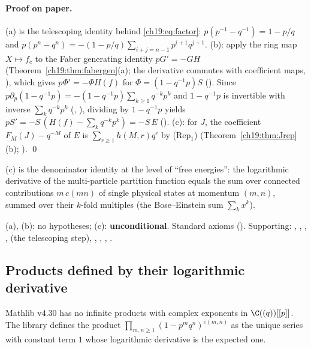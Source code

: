 \paragraph{Proof on paper.}  (a) is the telescoping identity behind \eqref{ch19:eq:factor}:
$p(p^{-1}-q^{-1})=1-p/q$ and $p(p^n-q^n)=-(1-p/q)\sum_{i+j=n-1}p^{i+1}q^{j+1}$.  (b): apply the ring map $X\mapsto f_c$ to the
Faber generating identity $pG'=-GH$ (Theorem~\ref{ch19:thm:fabergen}(a); the derivative commutes with coefficient maps,
), which gives $p\Phi'=-\Phi H(f)$ for $\Phi=(1-q^{-1}p)S$ ().  Since
$p\partial_p(1-q^{-1}p)=-(1-q^{-1}p)\sum_{k\ge1}q^{-k}p^k$ and $1-q^{-1}p$ is invertible with inverse
$\sum_kq^{-k}p^k$ (, ), dividing by $1-q^{-1}p$ yields
$pS'=-S\,(H(f)-\sum_kq^{-k}p^k)=-S\,E$ ().  (c): for $J$, the coefficient $F_M(J)-q^{-M}$ of $E$ is
$\sum_{r\ge1}h(M,r)q^r$ by (Rep$_1$) (Theorem~\ref{ch19:thm:Jrep}(b); ). \qed
\begin{physics}
(c) is the denominator identity at the level of ``free energies'': the logarithmic derivative of the multi-particle
partition function equals the sum over connected contributions $m\,c(mn)$ of single physical states at momentum
$(m,n)$, summed over their $k$-fold multiples (the Bose--Einstein sum $\sum_kx^k$).
\end{physics}
\begin{status}
(a), (b): no hypotheses; (c): \textbf{unconditional}.  Standard axioms ().  Supporting:
, , , ,
 (the telescoping step), , , ,
.
\end{status}

\subsection{Products defined by their logarithmic derivative}

Mathlib v4.30 has no infinite products with complex exponents in $\C((q))[[p]]$.  The library defines the product
$\prod_{m,n\ge1}(1-p^mq^n)^{e(m,n)}$ as the unique series with constant term $1$ whose logarithmic derivative is the
expected one.

